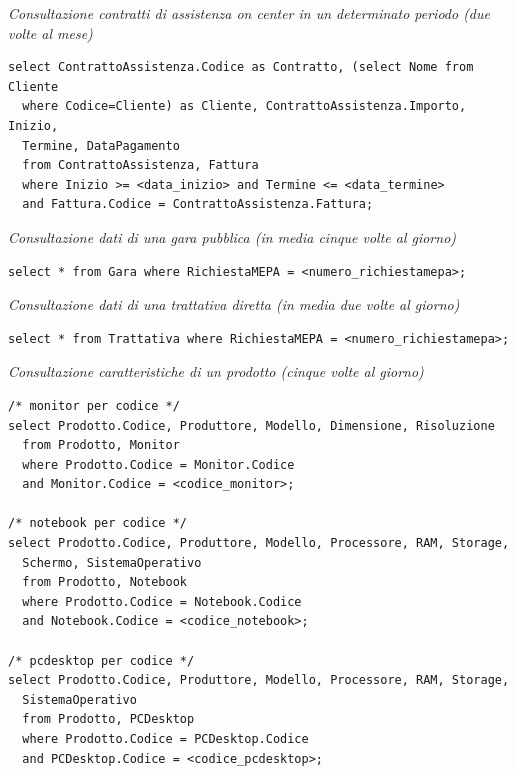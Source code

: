 \noindent\textit{Consultazione contratti di assistenza on center in un determinato periodo (due volte al mese)}
\begin{verbatim}
select ContrattoAssistenza.Codice as Contratto, (select Nome from Cliente
  where Codice=Cliente) as Cliente, ContrattoAssistenza.Importo, Inizio,
  Termine, DataPagamento
  from ContrattoAssistenza, Fattura
  where Inizio >= <data_inizio> and Termine <= <data_termine>
  and Fattura.Codice = ContrattoAssistenza.Fattura;

\end{verbatim}
\vspace{0.5cm}

\noindent{}
\newline\newline

\noindent\textit{Consultazione dati di una gara pubblica (in media cinque volte al giorno)}
\begin{verbatim}
select * from Gara where RichiestaMEPA = <numero_richiestamepa>;
\end{verbatim}
\vspace{1cm}

\noindent\textit{Consultazione dati di una trattativa diretta (in media due volte al giorno)}
\begin{verbatim}
select * from Trattativa where RichiestaMEPA = <numero_richiestamepa>;
\end{verbatim}
\vspace{1cm}

\noindent\textit{Consultazione caratteristiche di un prodotto (cinque volte al giorno)}
\begin{verbatim}
/* monitor per codice */
select Prodotto.Codice, Produttore, Modello, Dimensione, Risoluzione
  from Prodotto, Monitor
  where Prodotto.Codice = Monitor.Codice
  and Monitor.Codice = <codice_monitor>;

/* notebook per codice */
select Prodotto.Codice, Produttore, Modello, Processore, RAM, Storage,
  Schermo, SistemaOperativo
  from Prodotto, Notebook
  where Prodotto.Codice = Notebook.Codice
  and Notebook.Codice = <codice_notebook>;

/* pcdesktop per codice */
select Prodotto.Codice, Produttore, Modello, Processore, RAM, Storage,
  SistemaOperativo
  from Prodotto, PCDesktop
  where Prodotto.Codice = PCDesktop.Codice
  and PCDesktop.Codice = <codice_pcdesktop>;
\end{verbatim}
\vspace{0.5cm}

